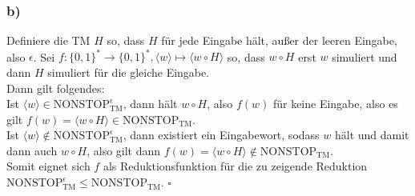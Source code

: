 \documentclass[12pt, a4paper]{article}
\newcommand*{\qed}{\null\nobreak\hfill\ensuremath{\square}}
\newcommand{\STOPe}{\text{NONSTOP}_\text{TM}^\epsilon}
\newcommand{\STOP}{\text{NONSTOP}_\text{TM}}
\begin{document}
\subsubsection*{b)}
Definiere die TM \(H\) so, dass \(H\) für jede Eingabe hält, außer der leeren Eingabe, also \(\epsilon\). Sei \(f : \{0,1\}^* \rightarrow \{0,1\}^*, \langle w \rangle \mapsto \langle w \circ H \rangle\) so, dass \(w \circ H\) erst \(w\) simuliert und dann \(H\) simuliert für die gleiche Eingabe. \\
Dann gilt folgendes: \\
Ist \(\langle w\rangle \in \STOPe\), dann hält \(w \circ H\), also \(f(w)\)  für keine Eingabe, also es gilt \(f(w) = \langle w \circ H \rangle \in \STOP\). \\
Ist \(\langle w\rangle \not\in \STOPe\), dann existiert ein Eingabewort, sodass \(w\) hält und damit dann auch \(w \circ H\), also gilt dann \(f(w) = \langle w \circ H \rangle \not\in \STOP\). \\
Somit eignet sich \(f\) als Reduktionsfunktion für die zu zeigende Reduktion \(\STOPe \le \STOP\). \qed
\end{document}
